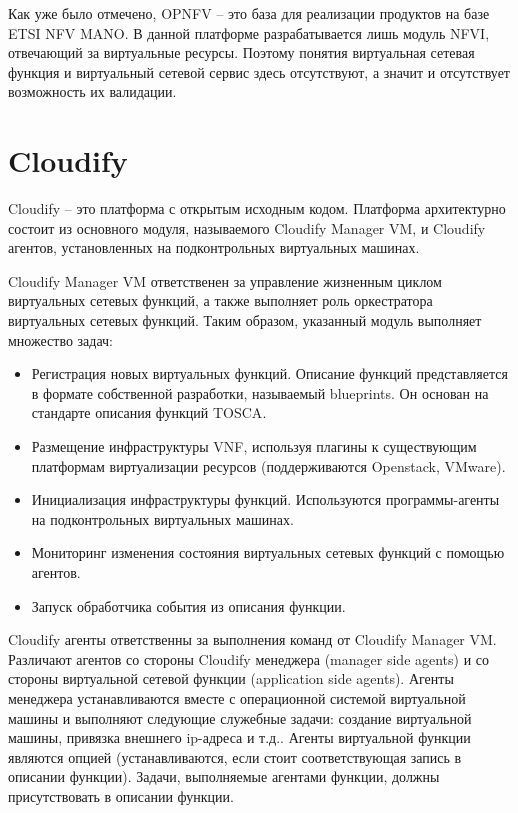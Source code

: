 \documentclass[oneside,final,14pt,a4paper]{extreport}
\begin{document}
Как уже было отмечено, OPNFV -- это база для реализации продуктов на базе ETSI NFV MANO. В данной платформе разрабатывается лишь модуль NFVI, отвечающий за виртуальные ресурсы. Поэтому понятия виртуальная сетевая функция и виртуальный сетевой сервис здесь отсутствуют, а значит и отсутствует возможность их валидации.


\section{Cloudify}
Cloudify\cite{bib:cloudify} -- это платформа с открытым исходным кодом. Платформа архитектурно состоит из основного модуля, называемого Cloudify Manager VM, и Cloudify агентов, установленных на подконтрольных виртуальных машинах. 

Cloudify Manager VM ответственен за управление жизненным циклом виртуальных сетевых функций, а также выполняет роль оркестратора виртуальных сетевых функций. Таким образом, указанный модуль выполняет множество задач:
\begin{itemize}
	\item Регистрация новых виртуальных функций. Описание функций представляется в формате собственной разработки, называемый blueprints\cite{}. Он основан на стандарте описания функций TOSCA\cite{bib:tosca}.
	\item Размещение инфраструктуры VNF, используя плагины к существующим платформам виртуализации ресурсов (поддерживаются Openstack, VMware).
	\item Инициализация инфраструктуры функций. Используются программы-агенты на подконтрольных виртуальных машинах.
	\item Мониторинг изменения состояния виртуальных сетевых функций с помощью агентов.
	\item Запуск обработчика события из описания функции.
\end{itemize}

Cloudify агенты ответственны за выполнения команд от Cloudify Manager VM. Различают агентов со стороны Cloudify менеджера (manager side agents) и со стороны виртуальной сетевой функции (application side agents). Агенты менеджера устанавливаются вместе с операционной системой виртуальной машины и выполняют следующие служебные задачи: создание виртуальной машины, привязка внешнего ip-адреса и т.д.. Агенты виртуальной функции являются опцией (устанавливаются, если стоит соответствующая запись в описании функции). Задачи, выполняемые агентами функции, должны присутствовать в описании функции.
\end{document}
